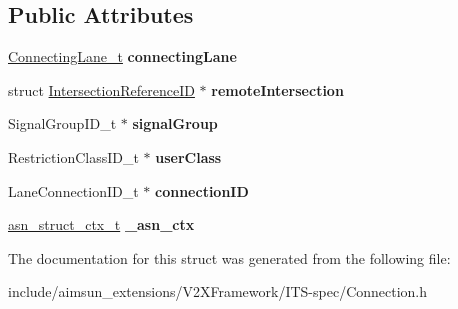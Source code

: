 \subsection*{Public Attributes}
\begin{DoxyCompactItemize}
\item 
\hyperlink{structConnectingLane}{Connecting\+Lane\+\_\+t} {\bfseries connecting\+Lane}\hypertarget{structConnection_abf7076c7b6cd26ba4e87ef6023451885}{}\label{structConnection_abf7076c7b6cd26ba4e87ef6023451885}

\item 
struct \hyperlink{structIntersectionReferenceID}{Intersection\+Reference\+ID} $\ast$ {\bfseries remote\+Intersection}\hypertarget{structConnection_a698019bf92265a99ab4a3b78237798a7}{}\label{structConnection_a698019bf92265a99ab4a3b78237798a7}

\item 
Signal\+Group\+I\+D\+\_\+t $\ast$ {\bfseries signal\+Group}\hypertarget{structConnection_a625bac5138cc65604c5b66f07b80385e}{}\label{structConnection_a625bac5138cc65604c5b66f07b80385e}

\item 
Restriction\+Class\+I\+D\+\_\+t $\ast$ {\bfseries user\+Class}\hypertarget{structConnection_ad404bb5ce45fe0c4e93466be6aae2fd0}{}\label{structConnection_ad404bb5ce45fe0c4e93466be6aae2fd0}

\item 
Lane\+Connection\+I\+D\+\_\+t $\ast$ {\bfseries connection\+ID}\hypertarget{structConnection_afcf4e4c5705173fa0464c7b26f508bcb}{}\label{structConnection_afcf4e4c5705173fa0464c7b26f508bcb}

\item 
\hyperlink{structasn__struct__ctx__s}{asn\+\_\+struct\+\_\+ctx\+\_\+t} {\bfseries \+\_\+asn\+\_\+ctx}\hypertarget{structConnection_a5f9a444f919809759dfb089929b310ee}{}\label{structConnection_a5f9a444f919809759dfb089929b310ee}

\end{DoxyCompactItemize}


The documentation for this struct was generated from the following file\+:\begin{DoxyCompactItemize}
\item 
include/aimsun\+\_\+extensions/\+V2\+X\+Framework/\+I\+T\+S-\/spec/Connection.\+h\end{DoxyCompactItemize}
